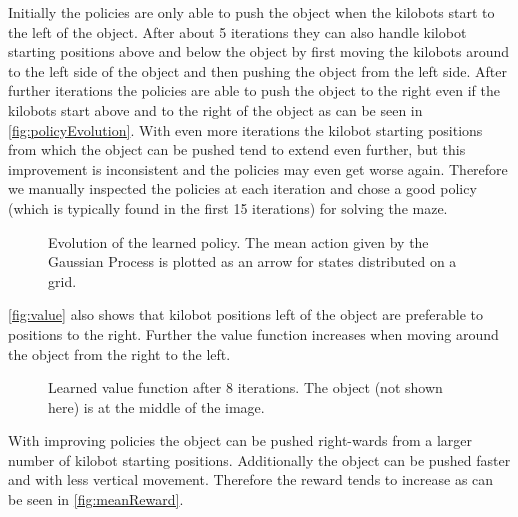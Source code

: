 \documentclass[twoside]{article}
\begin{document}
Initially the policies are only able to push the object when the kilobots start
to the left of the object. After about 5 iterations they can also handle kilobot
starting positions above and below the object by first moving the kilobots
around to the left side of the object and then pushing the object from the left
side. After further iterations the policies are able to push the object to the
right even if the kilobots start above and to the right of the object as can be
seen in \autoref{fig:policyEvolution}. With even more iterations the kilobot
starting positions from which the object can be pushed tend to extend even
further, but this improvement is inconsistent and the policies may even get
worse again.  Therefore we manually inspected the policies at each iteration and
chose a good
policy (which is typically found in the first 15 iterations) for solving
the maze.

\begin{figure}[!htb]
	\centering
    \hfill
    \hfill
    \hfill
    \hfill
	\caption[foo]{Evolution of the learned policy. The mean action given by the
    Gaussian Process is plotted as an arrow for states distributed on a grid.}
	\label{fig:policyEvolution}
\end{figure}

\autoref{fig:value} also shows that kilobot positions left of the object are
preferable to positions to the right. Further the value function increases when
moving around the object from the right to the left.

\begin{figure}[!htb]
	\centering
    \def\svgwidth{\columnwidth}
    
    \caption{Learned value function after 8 iterations. The object (not shown
             here) is at the middle of the image.}
	\label{fig:value}
\end{figure}

With improving policies the object can be pushed right-wards from a larger
number of kilobot starting positions. Additionally the object can be pushed
faster and with less vertical movement. Therefore the reward tends to increase
as can be seen in \autoref{fig:meanReward}.
\end{document}
